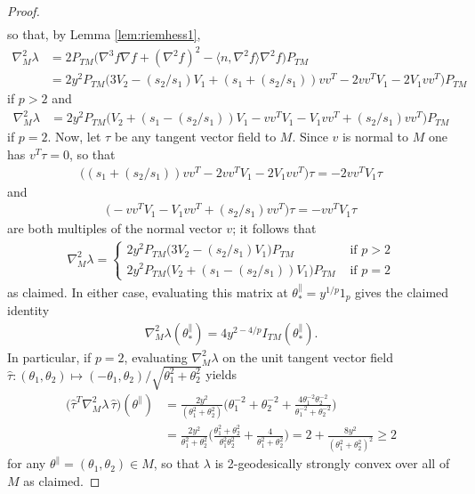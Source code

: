 \documentclass{article}
\newcommand{\tpa}{\theta^{\parallel}}
\theoremstyle{plain}
\theoremstyle{definition}
\theoremstyle{remark}
\begin{document}
\begin{proof}
\begin{align}
    \end{align}
    so that, by Lemma \ref{lem:riemhess1},
    \begin{align}
        \nabla^2_M\lambda &= 2P_{TM}\big(\nabla^3f\nabla f + (\nabla^2f)^2 - \langle n,\nabla^2 f\rangle \nabla^2f\big)P_{TM}\\&=2y^2P_{TM}\big(3V_2-(s_2/s_1)V_1 + (s_1+(s_2/s_1))vv^T-2vv^TV_1-2V_1vv^T\big)P_{TM}
     \end{align}
     if $p>2$ and
     \begin{align}
         \nabla^2_M\lambda &= 2y^2P_{TM}\big(V_2+(s_1-(s_2/s_1))V_1 - vv^TV_1 - V_1vv^T + (s_2/s_1)vv^T\big)P_{TM}
     \end{align}
     if $p = 2$. Now, let $\tau$ be any tangent vector field to $M$. Since $v$ is normal to $M$ one has $v^T\tau = 0$, so that
     \begin{align}
         \big((s_1+(s_2/s_1))vv^T-2vv^TV_1-2V_1vv^T\big)\tau = -2vv^TV_1\tau
     \end{align}
     and
     \begin{align}
         \big(-vv^TV_1-V_1vv^T + (s_2/s_1)vv^T\big)\tau =-vv^TV_1\tau 
     \end{align}
     are both multiples of the normal vector $v$; it follows that
     \begin{align}
         \nabla^2_M\lambda = \begin{cases} 2y^2P_{TM}\big(3V_2 - (s_2/s_1)V_1\big)P_{TM}&\text{ if $p>2$}\\ 2y^2P_{TM}\big(V_2 + (s_1-(s_2/s_1))V_1\big)P_{TM}&\text{ if $p=2$}\end{cases}
     \end{align}
     as claimed. In either case, evaluating this matrix at $\tpa_* = y^{1/p}1_p$ gives the claimed identity
     \begin{align}
        \nabla^2_M\lambda(\tpa_*) = 4y^{2-4/p} I_{TM}(\tpa_*).
     \end{align}
     In particular, if $p = 2$, evaluating $\nabla^2_M\lambda$ on the unit tangent vector field $\hat{\tau}:(\theta_1,\theta_2)\mapsto (-\theta_1,\theta_2)/\sqrt{\theta_1^2+\theta_2^2}$ yields
     \begin{align}
         \big(\hat{\tau}^T\nabla^2_M\lambda\,\hat{\tau}\big)(\tpa) &= \frac{2y^2}{(\theta_1^2+\theta_2^2)}\bigg(\theta_1^{-2}+\theta_2^{-2}+\frac{4\theta_1^{-2}\theta_2^{-2}}{\theta_1^{-2}+\theta_2^{-2}}\bigg)\\&=\frac{2y^2}{\theta_1^2+\theta_2^2}\bigg(\frac{\theta_1^2+\theta_2^2}{\theta_1^2\theta_2^2}+\frac{4}{\theta_1^2+\theta_2^2}\bigg) = 2+\frac{8y^2}{(\theta_1^2+\theta_2^2)^2}\geq 2
     \end{align}
     for any $\tpa = (\theta_1,\theta_2)\in M$, so that $\lambda$ is 2-geodesically strongly convex over all of $M$ as claimed.
    

\end{proof}
\end{document}
